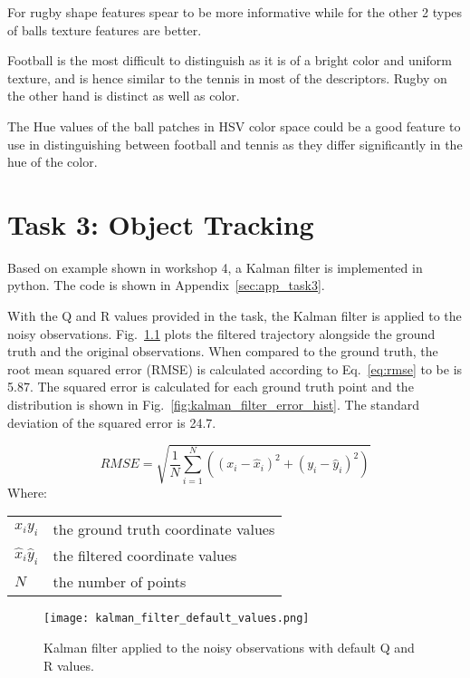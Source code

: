 \documentclass{report}
\makeatletter
\newenvironment{conditions}
  {\par\vspace{\abovedisplayskip}\noindent\begin{tabular}{>{$}l<{$} @{${}={}$} l}}
  {\end{tabular}\par\vspace{\belowdisplayskip}}
\makeatother
\begin{document}
For rugby shape features spear to be more informative while for the other 2 types of balls texture features are better.

Football is the most difficult to distinguish as it is of a bright color and uniform texture, and is hence similar to the tennis in most of the descriptors. Rugby on the other hand is distinct as well as color.

The Hue values of the ball patches in HSV color space could be a good feature to use in distinguishing between football and tennis as they differ significantly in the hue of the color.

\chapter{Task 3: Object Tracking}

Based on example shown in workshop 4, a Kalman filter is implemented in python. The code is shown in Appendix~\ref{sec:app_task3}.

With the Q and R values provided in the task, the Kalman filter is applied to the noisy observations. Fig.~\ref{fig:kalman_filter_default_values} plots the filtered trajectory alongside the ground truth and the original observations. When compared to the ground truth, the root mean squared error (RMSE) is calculated according to Eq.~\ref{eq:rmse} to be is 5.87. The squared error is calculated for each ground truth point and the distribution is shown in Fig.~\ref{fig:kalman_filter_error_hist}. The standard deviation of the squared error is 24.7.

\begin{equation}
    RMSE = \sqrt{\frac{1}{N} \sum_{i=1}^{N} ((x_{i} - \hat{x}_{i})^2 + (y_{i} - \hat{y}_{i})^2)}
    \label{eq:rmse}
\end{equation}
Where:
\begin{conditions}
 x_{i} y_{i}             & the ground truth coordinate values \\
 \hat{x}_{i} \hat{y}_{i} & the filtered coordinate values \\
 N                       & the number of points
\end{conditions}

\begin{figure}
    \centering
    \texttt{[image: kalman\_filter\_default\_values.png]}
    \caption{Kalman filter applied to the noisy observations with default Q and R values.}
    \label{fig:kalman_filter_default_values}
\end{figure}
\end{document}
